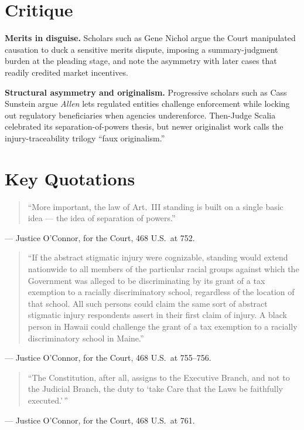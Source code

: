 \documentclass[12pt]{article}
\begin{document}
\section{Critique}

\textbf{Merits in disguise.} Scholars such as Gene Nichol argue the Court manipulated causation to duck a sensitive merits dispute, imposing a summary-judgment burden at the pleading stage, and note the asymmetry with later cases that readily credited market incentives.

\textbf{Structural asymmetry and originalism.} Progressive scholars such as Cass Sunstein argue \textit{Allen} lets regulated entities challenge enforcement while locking out regulatory beneficiaries when agencies underenforce. Then-Judge Scalia celebrated its separation-of-powers thesis, but newer originalist work calls the injury-traceability trilogy ``faux originalism.''

\section{Key Quotations}

\begin{quote}
``More important, the law of Art.\ III standing is built on a single basic idea --- the idea of separation of powers.''
\end{quote}
\noindent --- Justice O'Connor, for the Court, 468 U.S.\ at 752.

\begin{quote}
``If the abstract stigmatic injury were cognizable, standing would extend nationwide to all members of the particular racial groups against which the Government was alleged to be discriminating by its grant of a tax exemption to a racially discriminatory school, regardless of the location of that school. All such persons could claim the same sort of abstract stigmatic injury respondents assert in their first claim of injury. A black person in Hawaii could challenge the grant of a tax exemption to a racially discriminatory school in Maine.''
\end{quote}
\noindent --- Justice O'Connor, for the Court, 468 U.S.\ at 755--756.

\begin{quote}
``The Constitution, after all, assigns to the Executive Branch, and not to the Judicial Branch, the duty to `take Care that the Laws be faithfully executed.'\,''
\end{quote}
\noindent --- Justice O'Connor, for the Court, 468 U.S.\ at 761.
\end{document}
